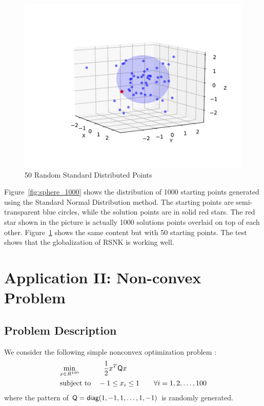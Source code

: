  \begin{figure}[H]
  \centering
  \includegraphics[clip,trim=50 50 20 75, width=1.0\columnwidth]{./figs/chap2/50.pdf}%
  \caption{50 Random Standard Distributed Points \label{fig:sphere_50}}
\end{figure}

Figure~\ref{fig:sphere_1000} shows the distribution of 1000 starting points generated using the Standard 
Normal Distribution method. The starting points are semi-transparent blue circles, while the solution points are in solid red stars. The red star shown in the picture is actually 1000 solutions points overlaid on top of each other. 
Figure~\ref{fig:sphere_50} shows the same content but with 50 starting points. The test shows that the globalization of RSNK is working well.  


\section{Application II: Non-convex Problem}
\subsection{Problem Description}
We consider the following simple nonconvex optimization problem :
\begin{equation*}
\begin{aligned}
&\underset{x \in R^{100}} {\text{min}}  
& &\phantom{-} \frac{1}{2}x^T \mathsf{Q} x \\
  & {\text{subject to}}
& &-1 \leq x_i \leq 1 \qquad \forall i = 1,2,\ldots,100 \\
\end{aligned}
\end{equation*}
where the pattern of $\mathsf{Q} = \textsf{diag}(1,-1,1,\ldots,1,-1)$ is randomly generated. 

